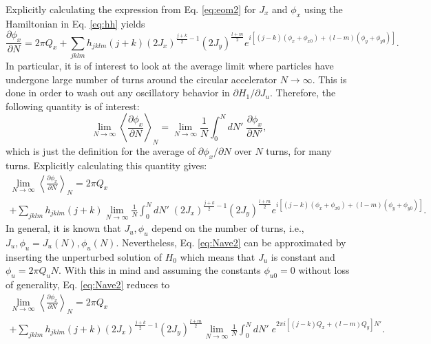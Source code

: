 Explicitly calculating the expression from Eq. \ref{eq:eom2} for $J_x$ and $\phi_x$ using the Hamiltonian in Eq. \ref{eq:hh} yields
\begin{equation}
    \label{eq:detune}
    \frac{\partial \phi_x}{\partial N} = 2\pi Q_x + \sum_{jklm} h_{jklm} \left( j+k \right) \left( 2 J_x\right)^{\frac{j+k}{2}-1} \left( 2 J_y\right)^{\frac{l+m}{2}} e^{i\left[ \left( j-k \right)\left( \phi_x+\phi_{x0} \right)+ \left( l-m \right) \left( \phi_y+\phi_{y0} \right)\right]}.
\end{equation}   
In particular, it is of interest to look at the average limit where particles have undergone large number of turns around the circular accelerator $N \rightarrow \infty$. This is done in order to wash out any oscillatory behavior in ${\partial H_1}/{\partial J_u}$. Therefore, the following quantity is of interest: 
\begin{equation}
    \label{eq:Nave1}
    \lim_{N\to\infty} \left\langle \frac{\partial \phi_x}{\partial N}\right\rangle _N = \lim_{N\to\infty} \frac{1}{N} \int_0^N dN' \; {\frac{\partial \phi_x}{\partial N'}},
\end{equation}
which is just the definition for the average of ${\partial \phi_x}/{\partial N}$ over $N$ turns, for many turns. Explicitly calculating this quantity gives:
\begin{multline}
    \label{eq:Nave2}
    \lim_{N\to\infty} \left\langle \frac{\partial \phi_x}{\partial N}\right\rangle _N = 2\pi Q_x\\
    +\sum_{jklm} h_{jklm} \left( j+k\right) \lim_{N\to\infty} \frac{1}{N} \int_0^N dN' \; \left( 2 J_x\right)^{\frac{j+k}{2}-1} \left( 2 J_y\right)^{\frac{l+m}{2}} e^{i\left[ \left( j-k \right)\left( \phi_x+\phi_{x0} \right)+ \left( l-m \right) \left( \phi_y+\phi_{y0} \right) \right]}.
\end{multline}
In general, it is known that $J_u,\phi_u$ depend on the number of turns, i.e., $J_u,\phi_u=J_u (N),\phi_u (N)$. Nevertheless, Eq. \ref{eq:Nave2} can be approximated by inserting the unperturbed solution of $H_0$ which means that $J_u$ is constant and $\phi_u = 2 \pi Q_u N$. With this in mind and assuming the constants $\phi_{u0}=0$ without loss of generality, Eq. \ref{eq:Nave2} reduces to
\begin{multline}
    \label{eq:Nave3}
    \lim_{N\to\infty} \left\langle \frac{\partial \phi_x}{\partial N}\right\rangle _N = 2\pi Q_x\\
    +\sum_{jklm} h_{jklm} \left( j+k \right) \left( 2 J_x\right)^{\frac{j+k}{2}-1} \left( 2 J_y\right)^{\frac{l+m}{2}} \lim_{N\to\infty} \frac{1}{N} \int_0^N dN' \;  e^{2 \pi i \left[ \left( j-k \right) Q_x+ \left( l-m \right) Q_y \right] N'}.
\end{multline}
